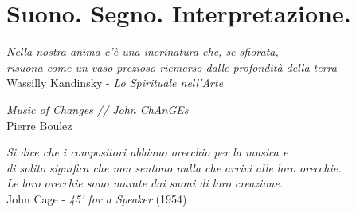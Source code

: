 

\chapter*{Suono. Segno. Interpretazione.}

	\begin{flushright}
		\textit{Nella nostra anima c'\`e una incrinatura che, se sfiorata, \\
		risuona come un vaso prezioso riemerso dalle profondit\`a della terra} \\
		Wassilly Kandinsky - \emph{Lo Spirituale nell'Arte}
	\end{flushright}

	\begin{flushright}
		\textit{Music of Changes // John ChAnGEs} \\
		Pierre Boulez
	\end{flushright}

	\begin{flushright}
		\textit{Si dice che i compositori abbiano orecchio per la musica e \\
		di solito significa che non sentono nulla che arrivi alle loro orecchie. \\
		Le loro orecchie sono murate dai suoni di loro creazione.} \\
		John Cage - \emph{45' for a Speaker} (1954)
	\end{flushright}

\bigskip

